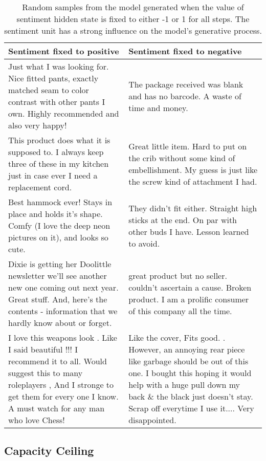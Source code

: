 \documentclass{article}
\begin{document}
\begin{table*}[!h]
\begin{center}
\label{sentiment-samples}
\def\arraystretch{1.5}
\begin{tabular}{p{8cm}p{8cm}}
\hline
{\bf Sentiment fixed to positive} & {\bf Sentiment fixed to negative} \\
\hline
Just what I was looking for. Nice fitted pants, exactly matched seam to color contrast with other pants I own. Highly recommended and also very happy! & The package received was blank and has no barcode. A waste of time and money. \\ 
This product does what it is supposed to.  I always keep three of these in my kitchen just in case ever I need a replacement cord. & Great little item. Hard to put on the crib without some kind of embellishment. My guess is just like the screw kind of attachment I had. \\
Best hammock ever! Stays in place and holds it's shape. Comfy (I love the deep neon pictures on it), and looks so cute. & They didn't fit either. Straight high sticks at the end.  On par with other buds I have.  Lesson learned to avoid. \\
Dixie is getting her Doolittle newsletter we'll see another new one coming out next year.  Great stuff.  And, here's the contents -  information that we hardly know about or forget. & great product but no seller. couldn't ascertain a cause. Broken product. I am a prolific consumer of this company all the time. \\
I love this weapons look . Like I said beautiful !!! I recommend it to all. Would suggest this to many roleplayers , And I stronge to get them for every one I know. A must watch for any man who love Chess! & Like the cover, Fits good. . However, an annoying rear piece like garbage should be out of this one. I bought this hoping it would help with a huge pull down my back \&  the black just doesn't stay. Scrap off everytime I use it.... Very disappointed. \\
\end{tabular}
\vspace{-4pt}
\caption{Random samples from the model generated when the value of sentiment hidden state is fixed to either -1 or 1 for all steps. The sentiment unit has a strong influence on the model's generative process.}
\end{center}
\end{table*}

\subsection{Capacity Ceiling}
\end{document}
